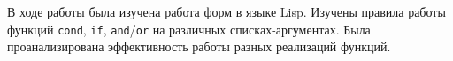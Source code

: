 \Conclusion

В ходе работы была изучена работа форм в языке Lisp. Изучены правила работы функций \texttt{cond}, \texttt{if}, \texttt{and}/\texttt{or} на различных списках-аргументах. Была проанализирована эффективность работы разных реализаций функций.
